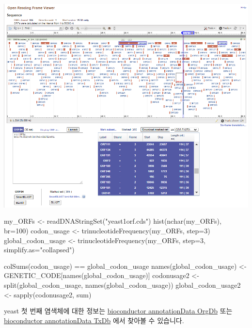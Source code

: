 \documentclass[
  a4paper,
]{book}
\newenvironment{Shaded}{\begin{snugshade}}{\end{snugshade}}
\newcommand{\AttributeTok}[1]{\textcolor[rgb]{0.40,0.45,0.13}{#1}}
\newcommand{\DecValTok}[1]{\textcolor[rgb]{0.68,0.00,0.00}{#1}}
\newcommand{\FunctionTok}[1]{\textcolor[rgb]{0.28,0.35,0.67}{#1}}
\newcommand{\NormalTok}[1]{\textcolor[rgb]{0.00,0.23,0.31}{#1}}
\newcommand{\OtherTok}[1]{\textcolor[rgb]{0.00,0.23,0.31}{#1}}
\newcommand{\SpecialCharTok}[1]{\textcolor[rgb]{0.37,0.37,0.37}{#1}}
\newcommand{\StringTok}[1]{\textcolor[rgb]{0.13,0.47,0.30}{#1}}
\begin{document}
\includegraphics{images/orffinder.PNG}

\begin{Shaded}
\begin{Highlighting}[]
\NormalTok{my\_ORFs }\OtherTok{\textless{}{-}} \FunctionTok{readDNAStringSet}\NormalTok{(}\StringTok{"yeast1orf.cds"}\NormalTok{)}
\FunctionTok{hist}\NormalTok{(}\FunctionTok{nchar}\NormalTok{(my\_ORFs), }\AttributeTok{br=}\DecValTok{100}\NormalTok{)}
\NormalTok{codon\_usage }\OtherTok{\textless{}{-}} \FunctionTok{trinucleotideFrequency}\NormalTok{(my\_ORFs, }\AttributeTok{step=}\DecValTok{3}\NormalTok{)}
\NormalTok{global\_codon\_usage }\OtherTok{\textless{}{-}} \FunctionTok{trinucleotideFrequency}\NormalTok{(my\_ORFs, }\AttributeTok{step=}\DecValTok{3}\NormalTok{, }\AttributeTok{simplify.as=}\StringTok{"collapsed"}\NormalTok{)}

\FunctionTok{colSums}\NormalTok{(codon\_usage) }\SpecialCharTok{==}\NormalTok{ global\_codon\_usage}
\FunctionTok{names}\NormalTok{(global\_codon\_usage) }\OtherTok{\textless{}{-}}\NormalTok{ GENETIC\_CODE[}\FunctionTok{names}\NormalTok{(global\_codon\_usage)]}
\NormalTok{codonusage2 }\OtherTok{\textless{}{-}} \FunctionTok{split}\NormalTok{(global\_codon\_usage, }\FunctionTok{names}\NormalTok{(global\_codon\_usage))}
\NormalTok{global\_codon\_usage2 }\OtherTok{\textless{}{-}} \FunctionTok{sapply}\NormalTok{(codonusage2, sum) }
\end{Highlighting}
\end{Shaded}

yeast 첫 번째 염색체에 대한 정보는
\href{http://bioconductor.org/packages/release/BiocViews.html\#___OrgDb}{bioconductor
annotationData OrgDb} 또는
\href{https://www.bioconductor.org/packages/release/BiocViews.html\#___TxDb}{bioconductor
annotationData TxDb} 에서 찾아볼 수 있습니다.
\end{document}
